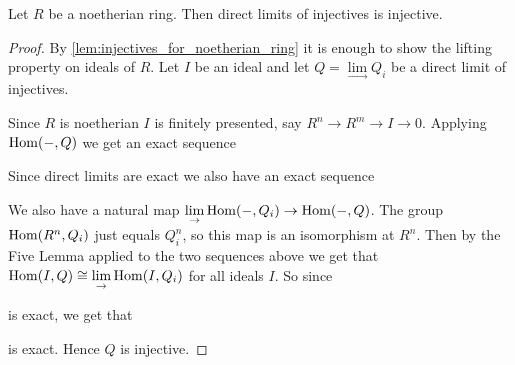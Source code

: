 \begin{theorem}\cite[Chapter I, Exercise 8]{CE56}
	Let $R$ be a noetherian ring. Then direct limits of injectives is injective.
	\begin{proof}
		By \cref{lem:injectives_for_noetherian_ring} it is enough to show the lifting property on ideals of $R$. Let $I$ be an ideal and let $Q = \lim\limits_{\rightarrow} Q_i$ be a direct limit of injectives.
		
		Since $R$ is noetherian $I$ is finitely presented, say $R^n \to R^m \to I \to 0$. Applying $\operatorname{Hom}(-,Q)$ we get an exact sequence 
		\begin{center}
		\end{center}
		Since direct limits are exact we also have an exact sequence
		\begin{center}
		\end{center}
		We also have a natural map $\lim\limits_{\rightarrow}\operatorname{Hom}(-, Q_i) \to \operatorname{Hom}(-, Q)$. The group $\operatorname{Hom}(R^n, Q_i)$ just equals $Q_i^n$, so this map is an isomorphism at $R^n$. Then by the Five Lemma applied to the two sequences above we get that $\operatorname{Hom}(I, Q) \cong \lim\limits_{\rightarrow}\operatorname{Hom}(I, Q_i)$ for all ideals $I$. So since 
		\begin{center}
		\end{center}
		is exact, we get that
		\begin{center}
		\end{center}
		is exact. Hence $Q$ is injective.
	\end{proof}
\end{theorem}

